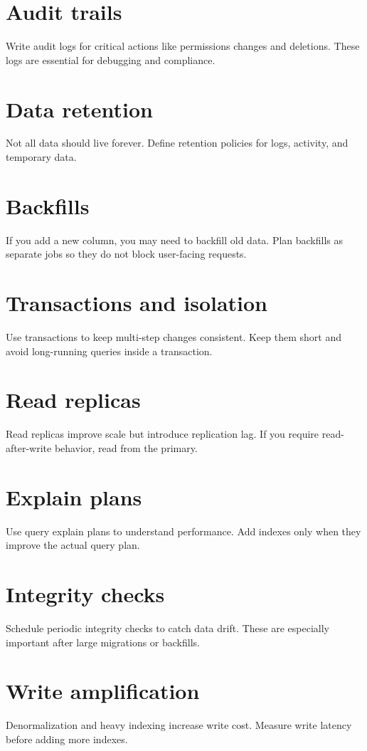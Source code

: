 \section{Audit trails}
Write audit logs for critical actions like permissions changes and deletions.
These logs are essential for debugging and compliance.

\section{Data retention}
Not all data should live forever.
Define retention policies for logs, activity, and temporary data.

\section{Backfills}
If you add a new column, you may need to backfill old data.
Plan backfills as separate jobs so they do not block user-facing requests.

\section{Transactions and isolation}
Use transactions to keep multi-step changes consistent.
Keep them short and avoid long-running queries inside a transaction.

\section{Read replicas}
Read replicas improve scale but introduce replication lag.
If you require read-after-write behavior, read from the primary.

\section{Explain plans}
Use query explain plans to understand performance.
Add indexes only when they improve the actual query plan.

\section{Integrity checks}
Schedule periodic integrity checks to catch data drift.
These are especially important after large migrations or backfills.

\section{Write amplification}
Denormalization and heavy indexing increase write cost.
Measure write latency before adding more indexes.


